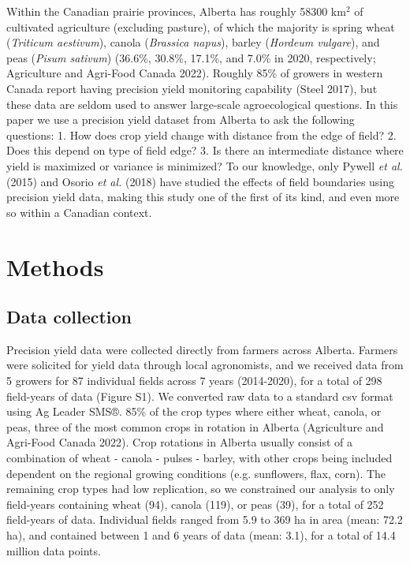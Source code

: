 \documentclass[]{elsarticle} %
\begin{document}
Within the Canadian prairie provinces, Alberta has roughly 58300 km$^2$ of cultivated agriculture (excluding pasture), of which the majority is spring wheat (\emph{Triticum aestivum}), canola (\emph{Brassica napus}), barley (\emph{Hordeum vulgare}), and peas (\emph{Pisum sativum}) (36.6\%, 30.8\%, 17.1\%, and 7.0\% in 2020, respectively; Agriculture and Agri-Food Canada 2022).
Roughly 85\% of growers in western Canada report having precision yield monitoring capability (Steel 2017), but these data are seldom used to answer large-scale agroecological questions.
In this paper we use a precision yield dataset from Alberta to ask the following questions:
1. How does crop yield change with distance from the edge of field?
2. Does this depend on type of field edge?
3. Is there an intermediate distance where yield is maximized or variance is minimized?
To our knowledge, only Pywell \emph{et al.} (2015) and Osorio \emph{et al.} (2018) have studied the effects of field boundaries using precision yield data, making this study one of the first of its kind, and even more so within a Canadian context.

\hypertarget{methods}{%
\section{Methods}\label{methods}}

\hypertarget{data-collection}{%
\subsection{Data collection}\label{data-collection}}

Precision yield data were collected directly from farmers across Alberta.
Farmers were solicited for yield data through local agronomists, and we received data from 5 growers for 87 individual fields across 7 years (2014-2020), for a total of 298 field-years of data (Figure S1).
We converted raw data to a standard csv format using Ag Leader SMS®.
85\% of the crop types where either wheat, canola, or peas, three of the most common crops in rotation in Alberta (Agriculture and Agri-Food Canada 2022).
Crop rotations in Alberta usually consist of a combination of wheat - canola - pulses - barley, with other crops being included dependent on the regional growing conditions (e.g. sunflowers, flax, corn).
The remaining crop types had low replication, so we constrained our analysis to only field-years containing wheat (94), canola (119), or peas (39), for a total of 252 field-years of data.
Individual fields ranged from 5.9 to 369 ha in area (mean: 72.2 ha), and contained between 1 and 6 years of data (mean: 3.1), for a total of 14.4 million data points.
\end{document}
